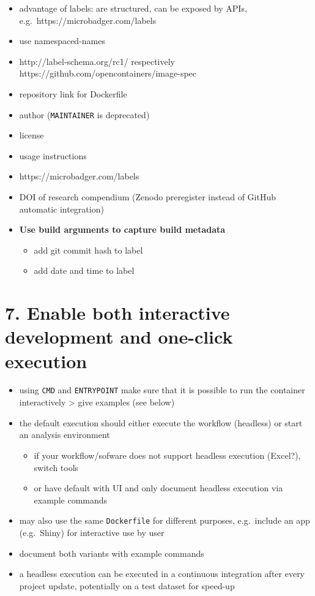 \documentclass[10pt,letterpaper]{article}
\providecommand{\tightlist}{%
  \setlength{\itemsep}{0pt}\setlength{\parskip}{0pt}}
\begin{document}
\begin{itemize}
\tightlist
\item
  advantage of labels: are structured, can be exposed by APIs,
  e.g.~https://microbadger.com/labels
\item
  use namespaced-names
\item
  http://label-schema.org/rc1/ respectively
  https://github.com/opencontainers/image-spec
\item
  repository link for Dockerfile
\item
  author (\texttt{MAINTAINER} is deprecated)
\item
  license
\item
  usage instructions
\item
  https://microbadger.com/labels
\item
  DOI of research compendium (Zenodo preregister instead of GitHub
  automatic integration)
\item
  \textbf{Use build arguments to capture build metadata}

  \begin{itemize}
  \tightlist
  \item
    add git commit hash to label
  \item
    add date and time to label
  \end{itemize}
\end{itemize}

\hypertarget{enable-both-interactive-development-and-one-click-execution}{%
\section*{7. Enable both interactive development and one-click
execution}\label{enable-both-interactive-development-and-one-click-execution}}

\begin{itemize}
\tightlist
\item
  using \texttt{CMD} and \texttt{ENTRYPOINT} make sure that it is
  possible to run the container interactively \textgreater{} give
  examples (see below)
\item
  the default execution should either execute the workflow (headless) or
  start an analysis environment

  \begin{itemize}
  \tightlist
  \item
    if your workflow/sofware does not support headless execution
    (Excel?), switch tools
  \item
    or have default with UI and only document headless execution via
    example commands
  \end{itemize}
\item
  may also use the same \texttt{Dockerfile} for different purposes,
  e.g.~include an app (e.g.~Shiny) for interactive use by user
\item
  document both variants with example commands
\item
  a headless execution can be executed in a continuous integration after
  every project update, potentially on a test dataset for speed-up
\end{itemize}
\end{document}
